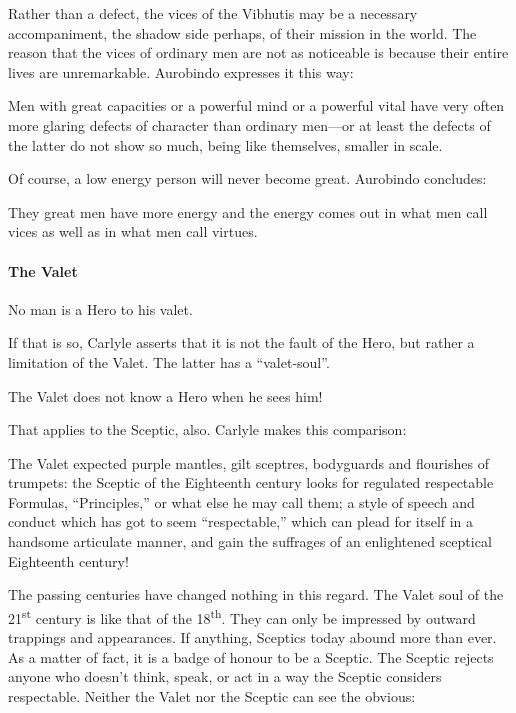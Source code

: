 Rather than a defect, the vices of the Vibhutis may be a necessary accompaniment, the shadow side perhaps, of their mission in the world. The reason that the vices of ordinary men are not as noticeable is because their entire lives are unremarkable. Aurobindo expresses it this way:

\begin{quotex}
Men with great capacities or a powerful mind or a powerful vital have very often more glaring defects of character than ordinary men---or at least the defects of the latter do not show so much, being like themselves, smaller in scale.
\end{quotex}


Of course, a low energy person will never become great. Aurobindo concludes:

\begin{quotex}
They great men have more energy and the energy comes out in what men call vices as well as in what men call virtues.
\end{quotex}


\paragraph{The Valet}


\begin{quotex}
No man is a Hero to his valet.
\end{quotex}


If that is so, Carlyle asserts that it is not the fault of the Hero, but rather a limitation of the Valet. The latter has a ``valet-soul''.

\begin{quotex}
The Valet does not know a Hero when he sees him!
\end{quotex}


That applies to the Sceptic, also. Carlyle makes this comparison:

\begin{quotex}
The Valet expected purple mantles, gilt sceptres, bodyguards and flourishes of trumpets: the Sceptic of the Eighteenth century looks for regulated respectable Formulas, ``Principles,'' or what else he may call them; a style of speech and conduct which has got to seem ``respectable,'' which can plead for itself in a handsome articulate manner, and gain the suffrages of an enlightened sceptical Eighteenth century!
\end{quotex}


The passing centuries have changed nothing in this regard. The Valet soul of the 21\textsuperscript{st} century is like that of the 18\textsuperscript{th}. They can only be impressed by outward trappings and appearances. If anything, Sceptics today abound more than ever. As a matter of fact, it is a badge of honour to be a Sceptic. The Sceptic rejects anyone who doesn't think, speak, or act in a way the Sceptic considers respectable. Neither the Valet nor the Sceptic can see the obvious:


